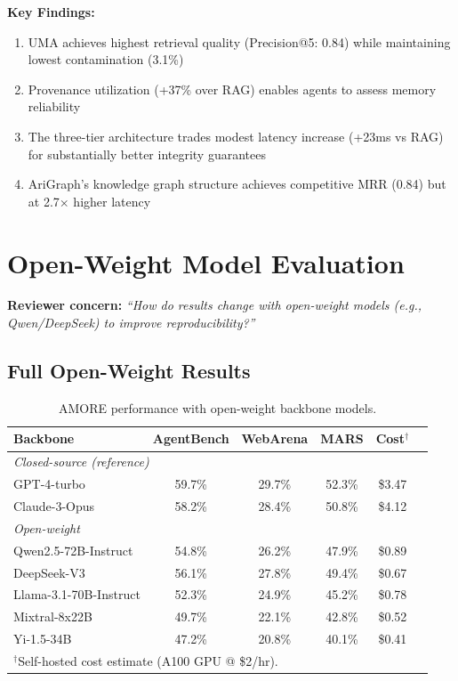 \documentclass{article}
\theoremstyle{plain}
\theoremstyle{definition}
\theoremstyle{remark}
\begin{document}
\textbf{Key Findings:}
\begin{enumerate}[nosep,leftmargin=*]
\item UMA achieves highest retrieval quality (Precision@5: 0.84) while maintaining lowest contamination (3.1\%)
\item Provenance utilization (+37\% over RAG) enables agents to assess memory reliability
\item The three-tier architecture trades modest latency increase (+23ms vs RAG) for substantially better integrity guarantees
\item AriGraph's knowledge graph structure achieves competitive MRR (0.84) but at 2.7$\times$ higher latency
\end{enumerate}

\section{Open-Weight Model Evaluation}
\label{app:open-weight}

\textbf{Reviewer concern:} \textit{``How do results change with open-weight models (e.g., Qwen/DeepSeek) to improve reproducibility?''}

\subsection{Full Open-Weight Results}

\begin{table}[h]
\centering
\caption{AMORE performance with open-weight backbone models.}
\label{tab:open-weight}
\small
\begin{tabular}{lccccc}
\toprule
\textbf{Backbone} & \textbf{AgentBench} & \textbf{WebArena} & \textbf{MARS} & \textbf{Cost$^\dagger$} \\
\midrule
\multicolumn{5}{l}{\textit{Closed-source (reference)}} \\
GPT-4-turbo & 59.7\% & 29.7\% & 52.3\% & \$3.47 \\
Claude-3-Opus & 58.2\% & 28.4\% & 50.8\% & \$4.12 \\
\midrule
\multicolumn{5}{l}{\textit{Open-weight}} \\
Qwen2.5-72B-Instruct & 54.8\% & 26.2\% & 47.9\% & \$0.89 \\
DeepSeek-V3 & 56.1\% & 27.8\% & 49.4\% & \$0.67 \\
Llama-3.1-70B-Instruct & 52.3\% & 24.9\% & 45.2\% & \$0.78 \\
Mixtral-8x22B & 49.7\% & 22.1\% & 42.8\% & \$0.52 \\
Yi-1.5-34B & 47.2\% & 20.8\% & 40.1\% & \$0.41 \\
\bottomrule
\multicolumn{5}{l}{\footnotesize $^\dagger$Self-hosted cost estimate (A100 GPU @ \$2/hr).}
\end{tabular}
\end{table}
\end{document}
